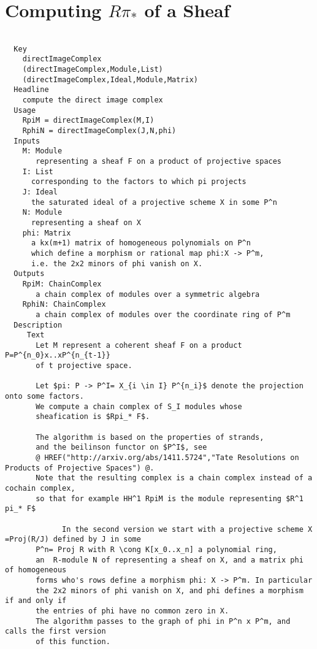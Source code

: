 \documentclass[twoside,12pt, leqno]{amsart}
\begin{document}
\section{Computing $R\pi_*$ of a Sheaf}
\begin{verbatim}
 
  Key
    directImageComplex
    (directImageComplex,Module,List)
    (directImageComplex,Ideal,Module,Matrix)
  Headline
    compute the direct image complex 
  Usage
    RpiM = directImageComplex(M,I)
    RphiN = directImageComplex(J,N,phi)
  Inputs
    M: Module
       representing a sheaf F on a product of projective spaces
    I: List
      corresponding to the factors to which pi projects
    J: Ideal
      the saturated ideal of a projective scheme X in some P^n
    N: Module
      representing a sheaf on X
    phi: Matrix
      a kx(m+1) matrix of homogeneous polynomials on P^n
      which define a morphism or rational map phi:X -> P^m,
      i.e. the 2x2 minors of phi vanish on X.      
  Outputs
    RpiM: ChainComplex
       a chain complex of modules over a symmetric algebra
    RphiN: ChainComplex
       a chain complex of modules over the coordinate ring of P^m
  Description
     Text
       Let M represent a coherent sheaf F on a product P=P^{n_0}x..xP^{n_{t-1}} 
       of t projective space. 
       
       Let $pi: P -> P^I= X_{i \in I} P^{n_i}$ denote the projection onto some factors. 
       We compute a chain complex of S_I modules whose
       sheafication is $Rpi_* F$. 
       
       The algorithm is based on the properties of strands,
       and the beilinson functor on $P^I$, see       
       @ HREF("http://arxiv.org/abs/1411.5724","Tate Resolutions on Products of Projective Spaces") @.
       Note that the resulting complex is a chain complex instead of a cochain complex,
       so that for example HH^1 RpiM is the module representing $R^1 pi_* F$
       
             In the second version we start with a projective scheme X =Proj(R/J) defined by J in some 
       P^n= Proj R with R \cong K[x_0..x_n] a polynomial ring,
       an  R-module N of representing a sheaf on X, and a matrix phi of homogeneous
       forms who's rows define a morphism phi: X -> P^m. In particular
       the 2x2 minors of phi vanish on X, and phi defines a morphism if and only if
       the entries of phi have no common zero in X.
       The algorithm passes to the graph of phi in P^n x P^m, and calls the first version
       of this function.



\end{verbatim}
\end{document}
